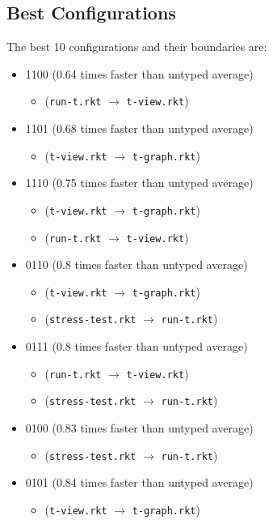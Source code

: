 \documentclass{article}
\newcommand{\mono}[1]{\texttt{#1}}
\begin{document}
\subsection{Best Configurations}
The best 10 configurations and their boundaries are:
\begin{itemize}
\item 1100 (0.64 times faster than untyped average)
  \begin{itemize}
  \item (\mono{run-t.rkt} $\rightarrow$ \mono{t-view.rkt})
  \end{itemize}
\item 1101 (0.68 times faster than untyped average)
  \begin{itemize}
  \item (\mono{t-view.rkt} $\rightarrow$ \mono{t-graph.rkt})
  \end{itemize}
\item 1110 (0.75 times faster than untyped average)
  \begin{itemize}
  \item (\mono{t-view.rkt} $\rightarrow$ \mono{t-graph.rkt})
  \item (\mono{run-t.rkt} $\rightarrow$ \mono{t-view.rkt})
  \end{itemize}
\item 0110 (0.8 times faster than untyped average)
  \begin{itemize}
  \item (\mono{t-view.rkt} $\rightarrow$ \mono{t-graph.rkt})
  \item (\mono{stress-test.rkt} $\rightarrow$ \mono{run-t.rkt})
  \end{itemize}
\item 0111 (0.8 times faster than untyped average)
  \begin{itemize}
  \item (\mono{run-t.rkt} $\rightarrow$ \mono{t-view.rkt})
  \item (\mono{stress-test.rkt} $\rightarrow$ \mono{run-t.rkt})
  \end{itemize}
\item 0100 (0.83 times faster than untyped average)
  \begin{itemize}
  \item (\mono{stress-test.rkt} $\rightarrow$ \mono{run-t.rkt})
  \end{itemize}
\item 0101 (0.84 times faster than untyped average)
  \begin{itemize}
  \item (\mono{t-view.rkt} $\rightarrow$ \mono{t-graph.rkt})

\end{itemize}
\end{itemize}
\end{document}
